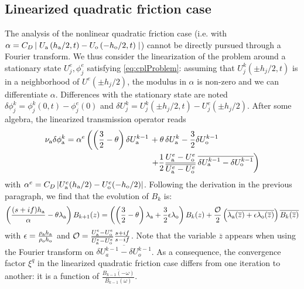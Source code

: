 \subsection{Linearized quadratic friction case}
The analysis of the nonlinear quadratic friction case (i.e. with $\alpha = C_D\left|\right.U_{\rm a}\left(h_{\rm a} / 2, t\right) - U_{\rm o}\left(- h_{\rm o}/2, t\right)\left.\right|$)
cannot be directly pursued through a Fourier transform.
We thus consider the linearization of the problem 
around a stationary state $U^e_j, \phi^e_j$ satisfying \eqref{eq:cplProblem}:
assuming that $U^k_j (\pm h_j/2, t)$ is in a neighborhood of $U^e(\pm h_j/2)$, the modulus in $\alpha$
is non-zero and
we can differentiate $\alpha$.
Differences with the stationary state are noted $\delta \phi_j^k = \phi^k_j(0,t) - \phi_j^e(0)$ and $\delta U_j^k = U_j^k(\pm h_j/2, t) - U^e_j(\pm h_j/2)$.
After some algebra, the linearized transmission operator reads
\begin{equation}
\label{eq:linearised}
\begin{aligned}
\nu_{\rm a}\delta\phi_{\rm a}^k =  \alpha^e 
\left( \left(\frac{3}{2} - \theta \right)\delta U_{\rm a}^{k-1} \right.
&+ \theta\, \delta U_{\rm a}^{k}
- \frac{3}{2} \delta U_{\rm o}^{k-1}
\\
&\left.+ \frac{1}{2}\frac{U_{\rm a}^{{\color{black} e}} - U_{\rm o}^{{\color{black} e}}}{\overline{U_{\rm a}^{{\color{black} e}} - U_{\rm o}^{{\color{black} e}}}}\,
\overline{
\delta U_{\rm a}^{k-1} - \delta U_{\rm o}^{k-1}}
\right)
\end{aligned}
\end{equation}
with $\alpha^e=C_D\left|U_{\rm a}^e(h_{\rm a}/2) - U_{\rm o}^e(-h_{\rm o}/2)\right|$.
Following the derivation in the previous paragraph,
we find that the evolution of $B_k$ is:
\begin{equation}
	\label{eq:OASchwarz_ConvergenceAnalysis_linearizedCV}
    \left(\frac{(s+if)h_{\rm a}}{\alpha} - \theta \lambda_{\rm a}\right)B_{k+1}(z)
    =
    \left(\left(\frac{3}{2} - \theta\right) 
    \lambda_{\rm a}
    + \frac{3}{2} \epsilon \lambda_{\rm o} \right) B_k(z)
    + \frac{
    \mathcal{O}
    }{2}
    \left(
    \overline{
    \lambda_{\rm a}(\overline{z})
    +
    \epsilon\lambda_{\rm o}(\overline{z})}
    \right)
    \overline{B_k(\overline{z})}
\end{equation}
with $\epsilon = \frac{\rho_{\rm a} h_{\rm a}}{\rho_{\rm o} h_{\rm o}}$ 
and $\mathcal{O} = 
\frac{U_{\rm a}^e - U_{\rm o}^e}{\overline{U_{\rm a}^e - U_{\rm o}^e}} \frac{s+if}{s - if}$.
Note that the variable $\overline{z}$ appears when using the Fourier
transform on $\overline{\delta U_a^{k-1} - \delta U_o^{k-1}}$.
As a consequence,
the convergence factor $\xi^q$ in the linearized 
quadratic friction case differs from one iteration to another:
it is a function of
$\frac{\overline{B_{k-1}(-\omega)}}{B_{k-1}(\omega)}$.
